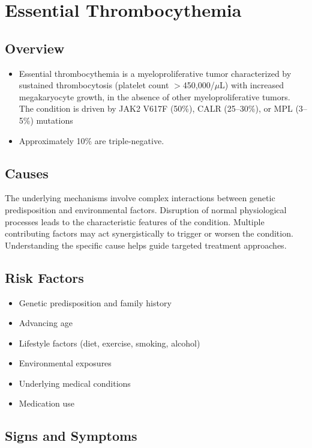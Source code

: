 \chapter{Essential Thrombocythemia}
\label{sec:Essential Thrombocythemia}

\section{Overview}


\begin{itemize}[noitemsep]
  \item Essential thrombocythemia is a myeloproliferative tumor characterized by sustained thrombocytosis (platelet count $>$450,000/$\mu$L) with increased megakaryocyte growth, in the absence of other myeloproliferative tumors. The condition is driven by JAK2 V617F (50\%), CALR (25--30\%), or MPL (3--5\%) mutations
  \item Approximately 10\% are triple-negative.
\end{itemize}
\section{Causes}
The underlying mechanisms involve complex interactions between genetic predisposition and environmental factors. Disruption of normal physiological processes leads to the characteristic features of the condition. Multiple contributing factors may act synergistically to trigger or worsen the condition. Understanding the specific cause helps guide targeted treatment approaches.
\section{Risk Factors}


\begin{itemize}[noitemsep]
  \item Genetic predisposition and family history
  \item Advancing age
  \item Lifestyle factors (diet, exercise, smoking, alcohol)
  \item Environmental exposures
  \item Underlying medical conditions
  \item Medication use
\end{itemize}
\section{Signs and Symptoms}

